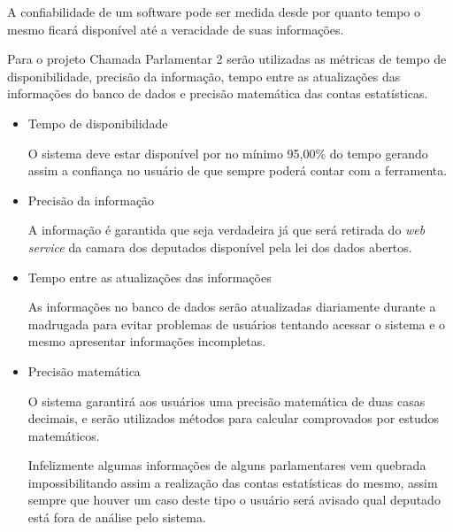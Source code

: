 A confiabilidade de um software pode ser medida desde por quanto tempo o mesmo ficará disponível até a veracidade de suas informações.

Para o projeto Chamada Parlamentar 2 serão utilizadas as métricas de tempo de disponibilidade, precisão da informação, tempo entre as atualizações das informações do banco de dados e precisão matemática das contas estatísticas.

\begin{itemize} 

	\item{Tempo de disponibilidade}

		O sistema deve estar disponível por no mínimo 95,00\% do tempo gerando assim a confiança no usuário de que sempre poderá contar com a ferramenta.

	\item{Precisão da informação}

		A informação é garantida que seja verdadeira já que será retirada do \textit{web service} da camara dos deputados disponível pela lei dos dados abertos.

	\item{Tempo entre as atualizações das informações}

		As informações no banco de dados serão atualizadas diariamente durante a madrugada para evitar problemas de usuários tentando acessar o sistema e o mesmo apresentar informações incompletas.

	\item{Precisão matemática}

		O sistema garantirá aos usuários uma precisão matemática de duas casas decimais, e serão utilizados métodos para calcular comprovados por estudos matemáticos.

		Infelizmente algumas informações de alguns parlamentares vem quebrada impossibilitando assim a realização das contas estatísticas do mesmo, assim sempre que houver um caso deste tipo o usuário será avisado qual deputado está fora de análise pelo sistema.

\end{itemize}
